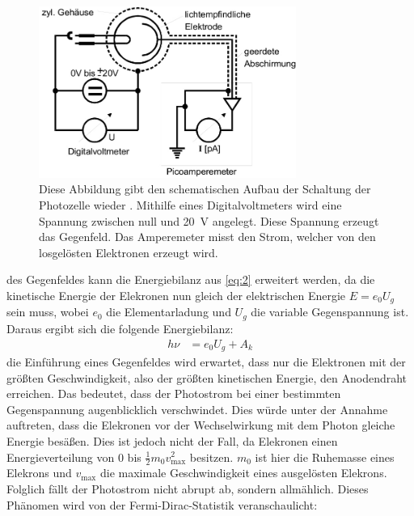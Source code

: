     \begin{figure}[H]
        \centering
        \includegraphics[width=0.75\textwidth]{images/Schaltbild.jpg}
        \caption{Diese Abbildung gibt den schematischen Aufbau der Schaltung der Photozelle wieder \cite{V500}. Mithilfe eines Digitalvoltmeters wird eine Spannung zwischen null und 
        \SI{20}{\volt} angelegt. Diese Spannung erzeugt das Gegenfeld. Das Amperemeter misst den Strom, welcher von den losgelösten Elektronen erzeugt wird.}
        \label{fig:3}
    \end{figure}
    \justifying des Gegenfeldes kann die Energiebilanz aus \eqref{eq:2} erweitert werden, da die kinetische Energie der Elekronen nun gleich der elektrischen Energie $E=e_0 U_g$ sein muss, 
    wobei $e_0$ die Elementarladung und $U_g$ die variable Gegenspannung ist. Daraus ergibt sich die folgende Energiebilanz: \cite{V500}
    \begin{align}
        h\nu &= e_0 U_g + A_k \label{eq:3}
    \end{align}
    \justifying die Einführung eines Gegenfeldes wird erwartet, dass nur die Elektronen mit der größten Geschwindigkeit, also der größten kinetischen Energie, den Anodendraht erreichen. 
    Das bedeutet, dass der Photostrom bei einer bestimmten Gegenspannung augenblicklich verschwindet. Dies würde unter der Annahme auftreten, dass die Elekronen vor der Wechselwirkung
    mit dem Photon gleiche Energie besäßen. Dies ist jedoch nicht der Fall, da Elekronen einen Energieverteilung von 0 bis $\frac{1}{2}m_0 v_{\text{max}}^2$ besitzen. $m_0$ ist 
    hier die Ruhemasse eines Elekrons und $v_{\text{max}}$ die maximale Geschwindigkeit eines ausgelösten Elekrons. Folglich fällt der Photostrom nicht abrupt ab, sondern allmählich.
    Dieses Phänomen wird von der Fermi-Dirac-Statistik veranschaulicht: \cite{V500}
